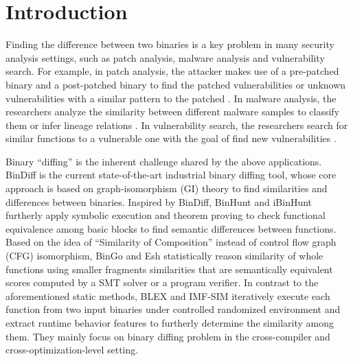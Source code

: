 \documentclass[10pt,conference]{IEEEtran}
\begin{document}




%
\IEEEpeerreviewmaketitle



\section{Introduction}
Finding the difference between two binaries is a key problem in many security analysis settings, 
such as patch analysis, malware analysis and vulnerability search. 
For example, in patch analysis, the attacker makes use of a pre-patched binary and a post-patched binary to find the patched 
vulnerabilities \cite{brumley2008automatic} or unknown vulnerabilities with a similar pattern 
to the patched \cite{xu2017spain}. 
In malware analysis, the researchers analyze the similarity between different malware samples to classify 
them \cite{bayer2009scalable}\cite{hu2009large} or infer lineage relations \cite{jang2013towards}. 
In vulnerability search, the researchers search for similar functions to a vulnerable one with the goal of find new vulnerabilities
 \cite{eschweiler2016discovre}\cite{feng2016scalable}\cite{xu2017neural}.

Binary “diffing” is the inherent challenge shared by the above applications. 
BinDiff \cite{bindiff} is the current state-of-the-art industrial binary diffing tool, whose core approach is based on graph-isomorphism (GI) 
theory \cite{Dullien2005}\cite{flake2004structural} to find similarities and differences between binaries. 
Inspired by BinDiff, BinHunt \cite{gao2008binhunt} and iBinHunt \cite{ming2012ibinhunt} furtherly apply symbolic 
execution and theorem proving to check functional equivalence among basic blocks to find semantic differences between functions. 
Based on the idea of “Similarity of Composition” instead of control flow graph (CFG) isomorphism, BinGo \cite{chandramohan2016bingo}
 and Esh \cite{david2016statistical} statistically reason similarity of whole functions using smaller fragments similarities that 
 are semantically equivalent scores computed by a SMT solver or a program verifier. 
In contrast to the aforementioned static methods, BLEX \cite{egele2014blanket} and IMF-SIM \cite{wang2017memory} iteratively execute each 
 function from two input binaries under controlled randomized environment and extract runtime behavior features to furtherly 
 determine the similarity among them. They mainly focus on binary diffing problem in the cross-compiler and cross-optimization-level setting. 
\end{document}
